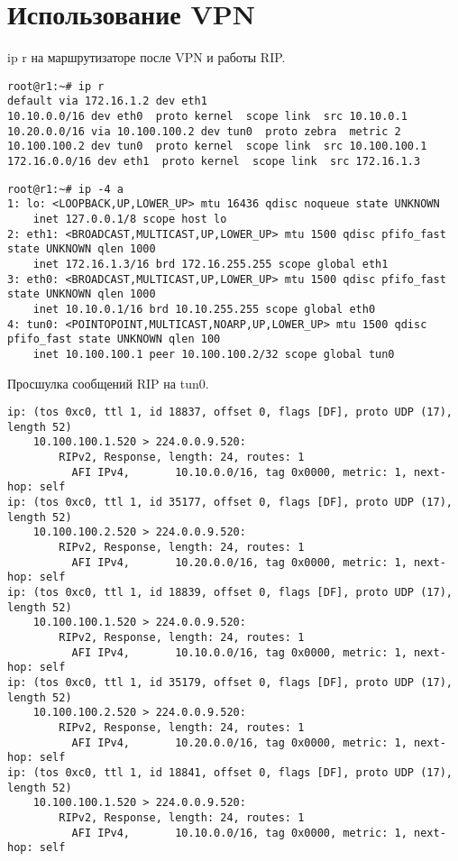 \documentclass[a4paper,12pt]{article}
\begin{document}
\section{Использование VPN}

ip r на маршрутизаторе после VPN и работы RIP.

\begin{lstlisting}
root@r1:~# ip r
default via 172.16.1.2 dev eth1 
10.10.0.0/16 dev eth0  proto kernel  scope link  src 10.10.0.1 
10.20.0.0/16 via 10.100.100.2 dev tun0  proto zebra  metric 2 
10.100.100.2 dev tun0  proto kernel  scope link  src 10.100.100.1 
172.16.0.0/16 dev eth1  proto kernel  scope link  src 172.16.1.3 
\end{lstlisting}

\begin{lstlisting}
root@r1:~# ip -4 a
1: lo: <LOOPBACK,UP,LOWER_UP> mtu 16436 qdisc noqueue state UNKNOWN 
    inet 127.0.0.1/8 scope host lo
2: eth1: <BROADCAST,MULTICAST,UP,LOWER_UP> mtu 1500 qdisc pfifo_fast state UNKNOWN qlen 1000
    inet 172.16.1.3/16 brd 172.16.255.255 scope global eth1
3: eth0: <BROADCAST,MULTICAST,UP,LOWER_UP> mtu 1500 qdisc pfifo_fast state UNKNOWN qlen 1000
    inet 10.10.0.1/16 brd 10.10.255.255 scope global eth0
4: tun0: <POINTOPOINT,MULTICAST,NOARP,UP,LOWER_UP> mtu 1500 qdisc pfifo_fast state UNKNOWN qlen 100
    inet 10.100.100.1 peer 10.100.100.2/32 scope global tun0
\end{lstlisting}

Просшулка сообщений RIP на tun0.

\begin{lstlisting}
ip: (tos 0xc0, ttl 1, id 18837, offset 0, flags [DF], proto UDP (17), length 52)
    10.100.100.1.520 > 224.0.0.9.520: 
        RIPv2, Response, length: 24, routes: 1
          AFI IPv4,       10.10.0.0/16, tag 0x0000, metric: 1, next-hop: self
ip: (tos 0xc0, ttl 1, id 35177, offset 0, flags [DF], proto UDP (17), length 52)
    10.100.100.2.520 > 224.0.0.9.520: 
        RIPv2, Response, length: 24, routes: 1
          AFI IPv4,       10.20.0.0/16, tag 0x0000, metric: 1, next-hop: self
ip: (tos 0xc0, ttl 1, id 18839, offset 0, flags [DF], proto UDP (17), length 52)
    10.100.100.1.520 > 224.0.0.9.520: 
        RIPv2, Response, length: 24, routes: 1
          AFI IPv4,       10.10.0.0/16, tag 0x0000, metric: 1, next-hop: self
ip: (tos 0xc0, ttl 1, id 35179, offset 0, flags [DF], proto UDP (17), length 52)
    10.100.100.2.520 > 224.0.0.9.520: 
        RIPv2, Response, length: 24, routes: 1
          AFI IPv4,       10.20.0.0/16, tag 0x0000, metric: 1, next-hop: self
ip: (tos 0xc0, ttl 1, id 18841, offset 0, flags [DF], proto UDP (17), length 52)
    10.100.100.1.520 > 224.0.0.9.520: 
        RIPv2, Response, length: 24, routes: 1
          AFI IPv4,       10.10.0.0/16, tag 0x0000, metric: 1, next-hop: self
\end{lstlisting}
\end{document}
